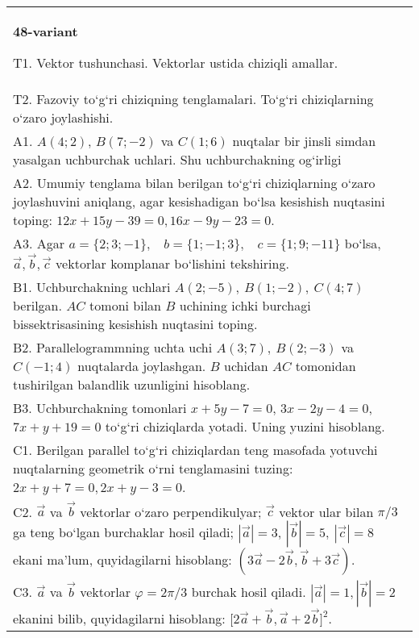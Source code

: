 \documentclass{article}
\begin{document}
\begin{tabular}{m{17cm}}
\textbf{48-variant}

T1. 
Vektor tushunchasi. Vektorlar ustida chiziqli amallar.
 \\
T2. 
Fazoviy to‘g‘ri chiziqning tenglamalari. To‘g‘ri chiziqlarning o‘zaro joylashishi.
 \\
A1. 
$A (4;2) $, $B (7;-2) $ va $C (1;6) $ nuqtalar bir jinsli
simdan yasalgan uchburchak uchlari. Shu uchburchakning og‘irligi
 \\
A2. 
Umumiy tenglama bilan berilgan to‘g‘ri chiziqlarning
o‘zaro joylashuvini aniqlang, agar kesishadigan bo‘lsa kesishish nuqtasini
toping: $12x+15y-39=0, 16x-9y-23=0$.
 \\
A3. 
Agar \(a = \{ 2;3; - 1\}, \ \ \ \ b = \{ 1; - 1;3\}, \ \ \ \ c = \{ 1;9; - 11\}\) bo‘lsa, $\overrightarrow{a}, \overrightarrow{b}, \overrightarrow{c}$ vektorlar komplanar bo‘lishini tekshiring.
 \\
B1. 
Uchburchakning uchlari \(A (2;-5),\ B (1;-2),\ C (4;7) \)
berilgan. $AC$ tomoni bilan $B$ uchining ichki burchagi
bissektrisasining kesishish nuqtasini toping.
 \\
B2. 
Parallelogrammning uchta uchi \(A (3;7),\ B (2;-3) \) va
\(C (-1;4) \) nuqtalarda joylashgan. $B$ uchidan $AC$
tomonidan tushirilgan balandlik uzunligini hisoblang.
 \\
B3. 
Uchburchakning tomonlari \(x+5y-7=0\),
\(3x-2y-4=0\), \(7x+y+19=0\) to‘g‘ri chiziqlarda yotadi. Uning
yuzini hisoblang.
 \\
C1. 
Berilgan parallel to‘g‘ri chiziqlardan teng masofada yotuvchi
nuqtalarning geometrik o‘rni tenglamasini tuzing: $2x+y+7=0, 2x+y-3=0$.
 \\
C2. 
$\vec{a}$ va $\vec{b}$ vektorlar o‘zaro perpendikulyar; $\vec{c}$ vektor ular bilan $\pi/3$ ga teng bo‘lgan burchaklar hosil qiladi; $|\vec{a}| = 3$, $|\vec{b}| = 5,\ |\vec{c}| = 8$ ekani ma’lum, quyidagilarni hisoblang:
$\left(3\vec{a} - 2\vec{b},\vec{b} + 3\vec{c} \right) $.
 \\
C3. 
$\vec{a}$ va $\vec{b}$ vektorlar $\varphi = 2\pi/3$ burchak hosil qiladi. $|\vec{a}| = 1,|\vec{b}| = 2$ ekanini bilib, quyidagilarni hisoblang:
$\lbrack 2\overrightarrow{a} + \overrightarrow{b},\overrightarrow{a} + 2\overrightarrow{b}\rbrack^{2}$.
 \\

\end{tabular}
\vspace{1cm}
\end{document}
